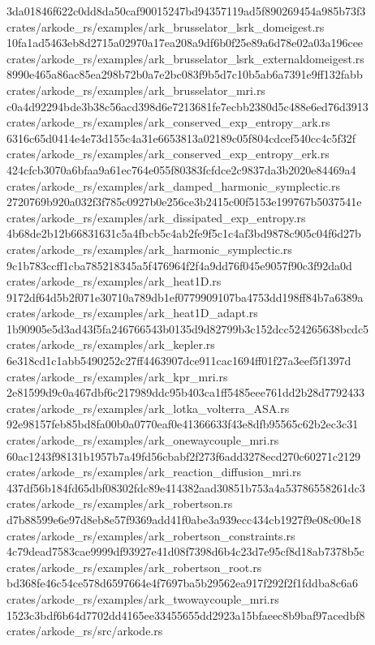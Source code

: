 \documentclass[
  10pt,
]{article}
\newenvironment{Shaded}{}{}
\newcommand{\NormalTok}[1]{#1}
\begin{document}
\begin{Shaded}
\begin{Highlighting}[]
\NormalTok{3da01846f622c0dd8da50caf90015247bd94357119ad5f890269454a985b73f3  crates/arkode\_rs/examples/ark\_brusselator\_lsrk\_domeigest.rs}
\NormalTok{10fa1ad5463eb8d2715a02970a17ea208a9df6b0f25e89a6d78e02a03a196cee  crates/arkode\_rs/examples/ark\_brusselator\_lsrk\_externaldomeigest.rs}
\NormalTok{8990e465a86ac85ea298b72b0a7e2bc083f9b5d7c10b5ab6a7391e9ff132fabb  crates/arkode\_rs/examples/ark\_brusselator\_mri.rs}
\NormalTok{c0a4d92294bde3b38c56acd398d6e7213681fe7ecbb2380d5c488e6ed76d3913  crates/arkode\_rs/examples/ark\_conserved\_exp\_entropy\_ark.rs}
\NormalTok{6316c65d0414e4e73d155c4a31e6653813a02189c05f804cdcef540cc4c5f32f  crates/arkode\_rs/examples/ark\_conserved\_exp\_entropy\_erk.rs}
\NormalTok{424cfcb3070a6bfaa9a61ec764e055f80383fcfdce2c9837da3b2020e84469a4  crates/arkode\_rs/examples/ark\_damped\_harmonic\_symplectic.rs}
\NormalTok{2720769b920a032f3f785c0927b0e256ce3b2415c00f5153e199767b5037541e  crates/arkode\_rs/examples/ark\_dissipated\_exp\_entropy.rs}
\NormalTok{4b68de2b12b66831631c5a4fbcb5c4ab2fe9f5c1c4af3bd9878c905c04f6d27b  crates/arkode\_rs/examples/ark\_harmonic\_symplectic.rs}
\NormalTok{9c1b783ccff1cba785218345a5f476964f2f4a9dd76f045e9057f90c3f92da0d  crates/arkode\_rs/examples/ark\_heat1D.rs}
\NormalTok{9172df64d5b2f071e30710a789db1ef0779909107ba4753dd198ff84b7a6389a  crates/arkode\_rs/examples/ark\_heat1D\_adapt.rs}
\NormalTok{1b90905e5d3ad43f5fa246766543b0135d9d82799b3c152dcc524265638bcdc5  crates/arkode\_rs/examples/ark\_kepler.rs}
\NormalTok{6e318cd1c1abb5490252c27ff4463907dce911cac1694ff01f27a3eef5f1397d  crates/arkode\_rs/examples/ark\_kpr\_mri.rs}
\NormalTok{2e81599d9c0a467dbf6c217989ddc95b403ca1ff5485eee761dd2b28d7792433  crates/arkode\_rs/examples/ark\_lotka\_volterra\_ASA.rs}
\NormalTok{92e98157feb85bd8fa00b0a0770eaf0e41366633f43e8dfb95565c62b2ec3c31  crates/arkode\_rs/examples/ark\_onewaycouple\_mri.rs}
\NormalTok{60ac1243f98131b1957b7a49fd56cbabf2f273f6add3278ecd270c60271c2129  crates/arkode\_rs/examples/ark\_reaction\_diffusion\_mri.rs}
\NormalTok{437df56b184fd65dbf08302fdc89e414382aad30851b753a4a53786558261dc3  crates/arkode\_rs/examples/ark\_robertson.rs}
\NormalTok{d7b88599e6e97d8eb8e57f9369add41f0abe3a939ecc434cb1927f9e08c00e18  crates/arkode\_rs/examples/ark\_robertson\_constraints.rs}
\NormalTok{4c79dead7583cae9999df93927e41d08f7398d6b4c23d7e95cf8d18ab7378b5c  crates/arkode\_rs/examples/ark\_robertson\_root.rs}
\NormalTok{bd368fe46c54ce578d6597664e4f7697ba5b29562ea917f292f2f1fddba8c6a6  crates/arkode\_rs/examples/ark\_twowaycouple\_mri.rs}
\NormalTok{1523c3bdf6b64d7702dd4165ee33455655dd2923a15bfaeec8b9baf97acedbf8  crates/arkode\_rs/src/arkode.rs}

\end{Highlighting}
\end{Shaded}
\end{document}

